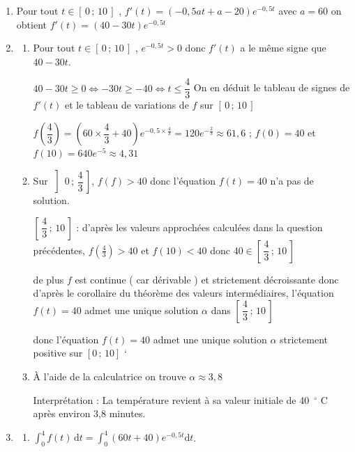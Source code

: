\documentclass[10pt]{article}
\begin{document}
\begin{enumerate}
\item Pour tout $t\in [\,0\,;\,10\,]$ , $ f'(t) =\left(-0{,}5 a t + a - 20\right) e^{-0{,}5t}$ avec $a=60$ on obtient $ f'(t) =(40 - 30 t) e^{-0{,}5 t}$

\item 
	\begin{enumerate}
		\item Pour tout $t\in [\,0\,;\,10\,]$ , $e^{-0{,}5t}>0$ donc $f'(t)$ a le même signe que $40 - 30t$.  

$40-30t \geqslant 0 \iff -30t \geqslant -40 \iff t \leqslant  \dfrac{4}{3}$ On en déduit le tableau de signes de $f'(t)$ et le tableau de variations de $f$ sur  $ [\,0\,;\,10\,]$ 


$f\left(\dfrac{4}{3}\right) =  \left(60 \times \dfrac{4}{3} + 40\right) e^{-0,5 \times \frac{4}{3}} = 120e^{-\frac{2}{3}}\approx 61,6$ ; $f(0)=40$ et $f(10)= 640 e^{-5} \approx 4,31 $

\item Sur $\left]\,0\,;\,\dfrac{4}{3}\,\right]$, $f(f)>40$ donc l'équation  $f(t) = 40$ n'a pas de solution. 

$\left[\,\dfrac{4}{3}\,;\,10\,\right]$ : d'après les valeurs approchées calculées dans la question précédentes, $f(\frac{4}{3}) > 40$ et $f(10) < 40$ donc $40 \in \left[\,\dfrac{4}{3}\,;\,10\,\right]$

de plus $f$ est continue ( car dérivable ) et strictement décroissante donc d'après le corollaire du théorème des valeurs intermédiaires, l'équation $f(t) = 40$ admet une unique solution $\alpha$ dans $\left[\,\dfrac{4}{3}\,;\,10\,\right]$

donc l'équation $f(t) = 40$ admet une unique solution $\alpha$
strictement positive sur $[0\,; \,10]$
`
\item À l'aide de la calculatrice on trouve $\alpha \approx 3,8$

Interprétation : La température revient à sa valeur initiale de 40~\ensuremath{^\circ} C après environ 3,8 minutes.
\end{enumerate}

\item
	\begin{enumerate}
		\item $\displaystyle \int_0^4 f(t)\,\text{d}t =\displaystyle  \int_0^4 (60 t + 40) e^{-0{,}5t} \text{d}t$.


\end{enumerate}
\end{enumerate}
\end{document}
